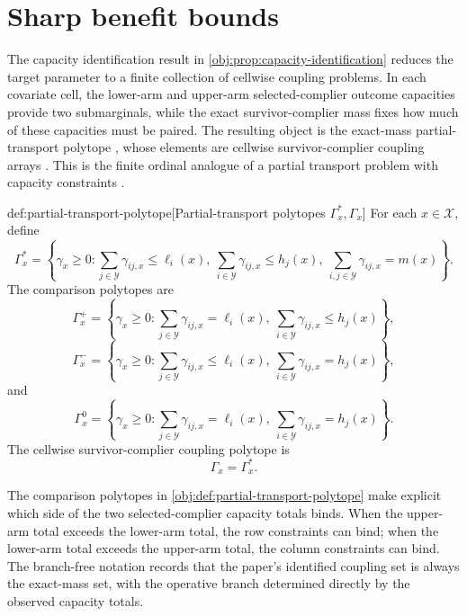 \section{Sharp benefit bounds}\label{sec:sharp-bounds}

The capacity identification result in \cref{obj:prop:capacity-identification} reduces the target parameter to a finite collection of cellwise coupling problems. In each covariate cell, the lower-arm and upper-arm selected-complier outcome capacities provide two submarginals, while the exact survivor-complier mass fixes how much of these capacities must be paired. The resulting object is the exact-mass partial-transport polytope , whose elements are cellwise survivor-complier coupling arrays . This is the finite ordinal analogue of a partial transport problem with capacity constraints \citep{Villani2009}.

\begin{definitionv}{def:partial-transport-polytope}[Partial-transport polytopes \(\Gamma_x^\ast,\Gamma_x\)]
For each \(x\in\mathcal X\), define
\[
\Gamma_x^{\ast}
=
\left\{
\gamma_x\ge0:
\sum_{j\in\mathcal Y}\gamma_{ij,x}\le\ell_i(x),\
\sum_{i\in\mathcal Y}\gamma_{ij,x}\le h_j(x),\
\sum_{i,j\in\mathcal Y}\gamma_{ij,x}=m(x)
\right\}.
\]
The comparison polytopes are
\[
\Gamma_x^{+}
=
\left\{
\gamma_x\ge0:
\sum_{j\in\mathcal Y}\gamma_{ij,x}=\ell_i(x),\
\sum_{i\in\mathcal Y}\gamma_{ij,x}\le h_j(x)
\right\},
\]
\[
\Gamma_x^{-}
=
\left\{
\gamma_x\ge0:
\sum_{j\in\mathcal Y}\gamma_{ij,x}\le\ell_i(x),\
\sum_{i\in\mathcal Y}\gamma_{ij,x}=h_j(x)
\right\},
\]
and
\[
\Gamma_x^{0}
=
\left\{
\gamma_x\ge0:
\sum_{j\in\mathcal Y}\gamma_{ij,x}=\ell_i(x),\
\sum_{i\in\mathcal Y}\gamma_{ij,x}=h_j(x)
\right\}.
\]
The cellwise survivor-complier coupling polytope is
\[
\Gamma_x=\Gamma_x^{\ast}.
\]
\end{definitionv}

The comparison polytopes in \cref{obj:def:partial-transport-polytope} make explicit which side of the two selected-complier capacity totals binds. When the upper-arm total exceeds the lower-arm total, the row constraints can bind; when the lower-arm total exceeds the upper-arm total, the column constraints can bind. The branch-free notation  records that the paper's identified coupling set is always the exact-mass set, with the operative branch determined directly by the observed capacity totals.

